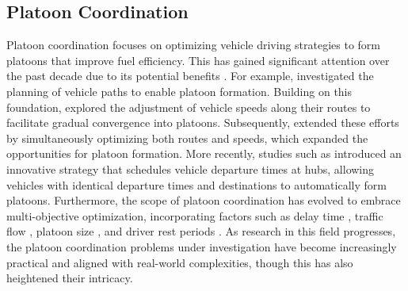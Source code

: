 \documentclass[lettersize,journal]{IEEEtran}
\begin{document}
\subsection{Platoon Coordination}
Platoon coordination focuses on optimizing vehicle driving strategies to form platoons that improve fuel efficiency. This has gained significant attention over the past decade due to its potential benefits \cite{lesch2021overview}.
For example, \cite{larson2013coordinated} investigated the planning of vehicle paths to enable platoon formation. 
Building on this foundation, \cite{liang2013fuel,liang2015heavy} explored the adjustment of vehicle speeds along their routes to facilitate gradual convergence into platoons. 
Subsequently, \cite{van2017fuel,van2015fuel} extended these efforts by simultaneously optimizing both routes and speeds, which expanded the opportunities for platoon formation.
More recently, studies such as \cite{zhang2017freight,johansson2018multi,boysen2018identical,johansson2021strategic} introduced an innovative strategy that schedules vehicle departure times at hubs, allowing vehicles with identical departure times and destinations to automatically form platoons.
Furthermore, the scope of platoon coordination has evolved to embrace multi-objective optimization, incorporating factors such as delay time \cite{johansson2022platoon}, traffic flow \cite{choi2024optimizing}, platoon size \cite{hu2024optimal}, and driver rest periods \cite{xu2022truck}. 
As research in this field progresses, the platoon coordination problems under investigation have become increasingly practical and aligned with real-world complexities, though this has also heightened their intricacy.
\end{document}
